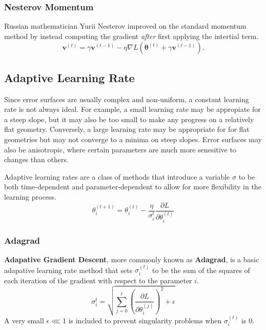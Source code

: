 \documentclass[12pt]{report}
\theoremstyle{definition}
\theoremstyle{remark}
\begin{document}
\subsubsection{Nesterov Momentum}
Russian mathematician Yurii Nesterov improved on the standard momentum method by instead computing the gradient \textit{after} first applying the intertial term.
\begin{equation}
    \mathbf{v}^{(t)} = \gamma \mathbf{v}^{(t-1)} - \eta \nabla L(\boldsymbol{\theta}^{(t)} + \gamma \mathbf{v}^{(t-1)}).
\end{equation}

\subsection{Adaptive Learning Rate}
Since error surfaces are usually complex and non-uniform, a constant learning rate is not always ideal. For example, a small learning rate may be appropiate for a steep slope, but it may also be too small to make any progress on a relatively flat geometry. Conversely, a large learning rate may be appropriate for for flat geometries but may not converge to a minima on steep slopes. Error surfaces may also be anisotropic, where certain parameters are much more senesitive to changes than others.

Adaptive learning rates are a class of methods that introduce a variable $\sigma$ to be both time-dependent and parameter-dependent to allow for more flexibility in the learning process.
\begin{equation}
    \theta_{i}^{(t+1)} = \theta_{i}^{(t)} - \frac{\eta}{\sigma_i^t}\frac{\partial L}{\partial \theta_i^{(t)}}
\end{equation}

\subsubsection{Adagrad}
\textbf{Adapative Gradient Descent}, more commonly known as \textbf{Adagrad}, is a basic adapative learning rate method that sets $\sigma_i^{(t)}$ to be the sum of the squares of each iteration of the gradient with respect to the parameter $i$.
\begin{equation}
    \sigma_i^t = \sqrt{\sum_{j=0}^t {\left(\frac{\partial L}{\partial \theta_i^{(j)}}\right)}^2 + \epsilon}
\end{equation}
A very small $\epsilon \lll 1$ is included to prevent singularity problems when $\sigma_i^{(t)}$ is $0$.
\end{document}
